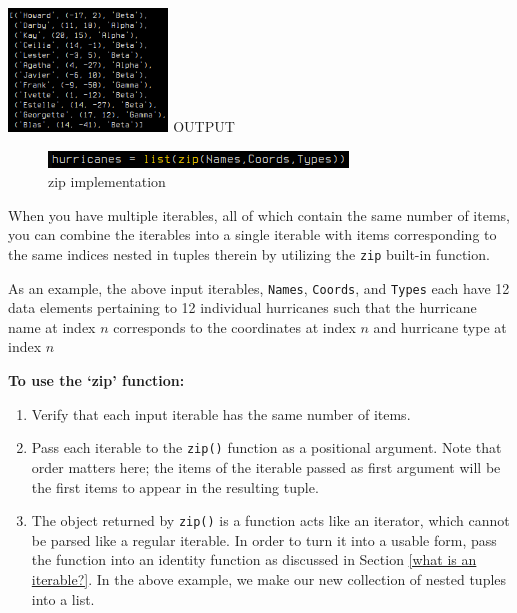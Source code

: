 \documentclass[12pt]{article}
\begin{document}
\begin{center}
\begin{minipage}[c]{.1\textwidth}
	\end{minipage}
	\begin{minipage}[c]{.4\textwidth}
		\begin{center}
		\includegraphics[height=124px]{./figures/1_zip/out_zip.png}
		\textsc{OUTPUT}
		\end{center}
	\end{minipage}\vspace{.12in}
\end{center}

\begin{figure}
	\begin{center}
		\includegraphics[width=.58\textwidth]{./figures/1_zip/codeblock_zip.png}
		\caption{zip implementation}
		\label{zip code} %
	\end{center}
\end{figure}

When you have multiple iterables, all of which contain the same number of items, you can combine the iterables into a single iterable with items corresponding to the same indices nested in tuples therein by utilizing the \texttt{zip} built-in function.

As an example, the above input iterables, \texttt{Names}, \texttt{Coords}, and \texttt{Types} each have 12 data elements pertaining to 12 individual hurricanes such that the hurricane name at index $n$ corresponds to the coordinates at index $n$ and hurricane type at index $n$

\vspace{1em}
\noindent
\textbf{To use the `zip' function:}

\begin{enumerate}
	\item{Verify that each input iterable has the same number of items.}
	\item{Pass each iterable to the \texttt{zip()} function as a positional argument. Note that order matters here; the items of the iterable passed as first argument will be the first items to appear in the resulting tuple.}
	\item{The object returned by \texttt{zip()} is a function acts like an iterator, which cannot be parsed like a regular iterable. In order to turn it into a usable form, pass the function into an identity function as discussed in Section \ref{what is an iterable?}. In the above example, we make our new collection of nested tuples into a list.}
\end{enumerate}
\end{document}
